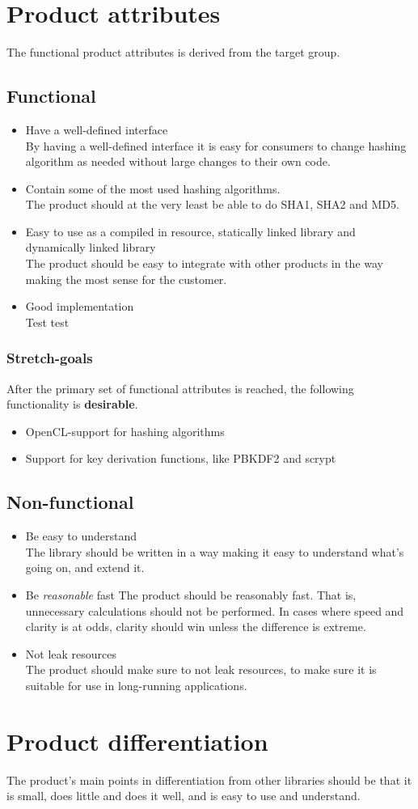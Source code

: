 \documentclass[12pt]{article}
\begin{document}
\section*{Product attributes}
The functional product attributes is derived from the target group.

\subsection*{Functional}
\begin{itemize}
\item Have a well-defined interface\\
By having a well-defined interface it is easy for consumers to change hashing algorithm as needed without large changes to their own code.
\item Contain some of the most used hashing algorithms.\\
The product should at the very least be able to do SHA1, SHA2 and MD5.
\item Easy to use as a compiled in resource, statically linked library and dynamically linked library\\
The product should be easy to integrate with other products in the way making the most sense for the customer.
\item Good implementation\\
Test test
\end{itemize}

\subsubsection*{Stretch-goals}
After the primary set of functional attributes is reached, the following functionality is \textbf{desirable}.
\begin{itemize}
\item OpenCL-support for hashing algorithms
\item Support for key derivation functions, like PBKDF2 and scrypt
\end{itemize}

\subsection*{Non-functional}
\begin{itemize}
\item Be easy to understand\\
The library should be written in a way making it easy to understand what's going on, and extend it.
\item Be \textit{reasonable} fast
The product should be reasonably fast. That is, unnecessary calculations should not be performed. In cases where speed and clarity is at odds, clarity should win unless the difference is extreme.
\item Not leak resources\\
The product should make sure to not leak resources, to make sure it is suitable for use in long-running applications.
\end{itemize}

\section*{Product differentiation}
The product's main points in differentiation from other libraries should be that it is small, does little and does it well, and is easy to use and understand.
\end{document}
